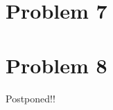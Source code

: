 \documentclass[11pt,letterpaper]{article}
\begin{document}
\begin{enumerate}[(a)]
\end{enumerate}
\clearpage

\section*{Problem 7}

\clearpage
\section*{Problem 8}
Postponed!!

%
\end{document}

